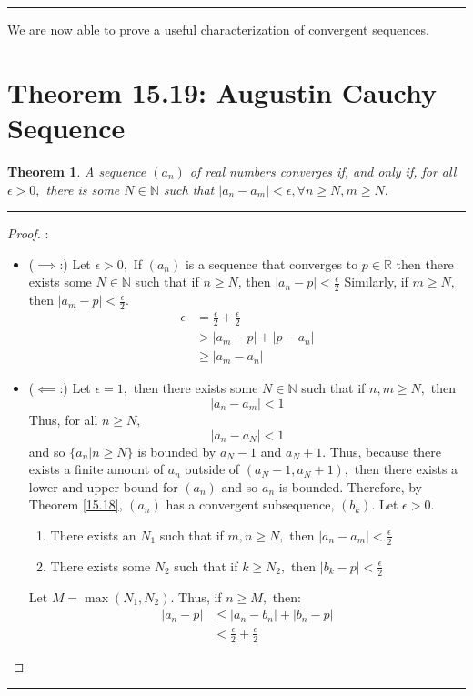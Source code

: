 \documentclass[openany, amssymb, psamsfonts]{amsart}
\newcommand{\bbN}{\mathbb{N}}
\newcommand{\bbR}{\mathbb{R}}
\newtheorem{thm}{Theorem}[section]
\theoremstyle{definition}
\numberwithin{equation}{section}
\begin{document}
\vspace{4pt}     \hrule   \vspace{4pt}

We are now able to prove a useful characterization of convergent sequences.



\section*{Theorem 15.19: Augustin Cauchy Sequence}
\begin{thm} \label{15.19}  A sequence $(a_n)$ of real numbers converges if, and only if, for all $\epsilon>0,$ there is some $N\in\bbN$ such that $|a_n-a_m|<\epsilon,\forall n\geq N, m\geq N.$
\end{thm}
\vspace{4pt}     \hrule   \vspace{4pt}\begin{proof}:\\
\begin{itemize}
    \item ($\implies$:) Let $\epsilon>0,$ If $(a_n)$ is a sequence that converges to $p\in \bbR$ then there exists some $N \in \bbN$ such that if $n\geq N$, then $|a_n - p|< \frac{\epsilon}{2}$ Similarly, if $m\geq N,$ then $|a_m - p|<\frac{\epsilon}{2}.$ 
    \begin{align*}
        \epsilon &= \frac{\epsilon}{2}+ \frac{\epsilon}{2}\\
        &> |a_m - p| + |p-a_n|\\
        &\geq |a_m - a_n|
    \end{align*}
    \item ($\impliedby$:) Let $\epsilon = 1,$ then there exists some $N \in \bbN$ such that if $n,m\geq N,$ then 
    \[|a_n - a_m|< 1\] 
    Thus, for all $n\geq N,$ \[|a_n - a_N|<1\] and so $\{a_n|n\geq N\}$ is bounded by $a_N - 1$ and $a_N + 1.$ Thus, because there exists a finite 
    amount of $a_n$ outside of $(a_N-1, a_N+1),$ then there exists a lower and upper bound for $(a_n)$ and so $a_n$ is bounded. Therefore, by Theorem \ref{15.18}, $(a_n)$ has a convergent subsequence, $(b_k).$ Let $\epsilon>0.$
    \begin{enumerate}
        \item There exists an $N_1$ such that if $m,n \geq N,$ then $|a_n - a_m|< \frac{\epsilon}{2}$
        \item There exists some $N_2$ such that if $k\geq N_2,$ then $|b_k - p|< \frac{\epsilon}{2}$
    \end{enumerate}
    Let $M = \max(N_1, N_2).$ Thus, if $n\geq M,$ then:
    \begin{align*}
        |a_n - p| &\leq |a_n- b_n| + |b_n - p|\\
        &< \frac{\epsilon}{2} + \frac{\epsilon}{2}
    \end{align*}
\end{itemize}
\end{proof}\vspace{4pt}     \hrule   \vspace{4pt}
\end{document}
